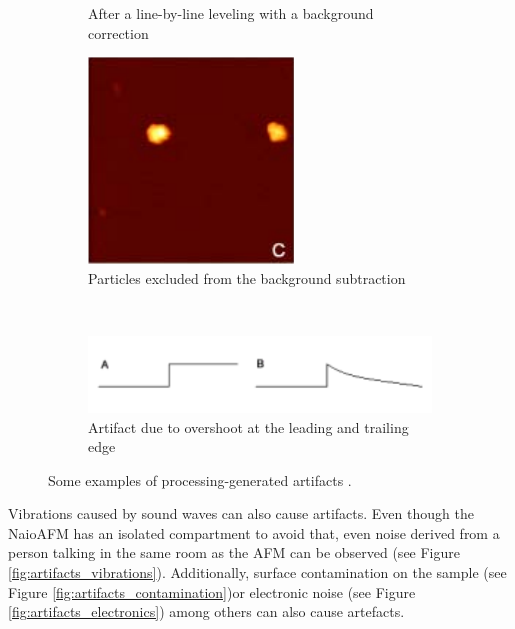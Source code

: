 \documentclass[11pt,a4paper]{article}
\begin{document}
\begin{figure}[H]
\begin{subfigure}[b]{0.3\textwidth}
\caption{After a line-by-line leveling with a background correction}
\label{fig:artifacts_processing_2}
\end{subfigure}
\begin{subfigure}[b]{0.3\textwidth}
\includegraphics[width=\textwidth]{artifacts_processing_3}
\caption{Particles excluded from the background subtraction}
\label{fig:artifacts_processing_3}
\end{subfigure}\\\vspace{.2cm}
\begin{subfigure}[b]{0.6\textwidth}
\includegraphics[width=\textwidth]{artifacts_processing_4}
\caption{Artifact due to overshoot at the leading and trailing edge}
\label{fig:artifacts_processing_4}
\end{subfigure}
\caption{Some examples of processing-generated artifacts \cite{artifacts}.}
\label{fig:artifacts_processing}
\end{figure}

Vibrations caused by sound waves can also cause artifacts. Even though the NaioAFM has an isolated compartment to avoid that, even noise derived from a person talking in the same room as the AFM can be observed (see Figure \ref{fig:artifacts_vibrations}). Additionally, surface contamination on the sample (see Figure \ref{fig:artifacts_contamination})or electronic noise (see Figure \ref{fig:artifacts_electronics}) among others can also cause artefacts.
\end{document}
